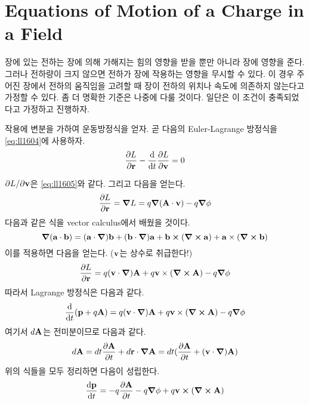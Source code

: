 \section{Equations of Motion of a Charge in a Field}
\label{sec:05a-03a}

장에 있는 전하는 장에 의해 가해지는 힘의 영향을 받을 뿐만 아니라 장에 영향을 준다. 그러나 전하량이 크지 않으면 전하가 장에 작용하는 영향을 무시할 수 있다. 이 경우 주어진 장에서 전하의 움직임을 고려할 때 장이 전하의 위치나 속도에 의존하지 않는다고 가정할 수 있다. 좀 더 명확한 기준은 나중에 다룰 것이다. 일단은 이 조건이 충족되었다고 가정하고 진행하자.

작용에 변분을 가하여 운동방정식을 얻자. 곧 다음의 Euler-Lagrange 방정식을 \eqref{eq:ll1604}에 사용하자.
\begin{equation}
    \pdv{L}{\vb{r}} - \dv{t} \pdv{L}{\vb{v}} = 0
\end{equation}

$\partial L / \partial \vb{v}$은 \eqref{eq:ll1605}와 같다. 그리고 다음을 얻는다.
\begin{equation*}
    \pdv{L}{\vb{r}} = \grad L = q \grad(\vb{A} \cdot \vb{v}) - q \grad \phi
\end{equation*}
다음과 같은 식을 vector calculus에서 배웠을 것이다.
\begin{equation*}
    \grad(\vb{a} \cdot \vb{b}) = (\vb{a} \cdot \grad) \vb{b} + (\vb{b} \cdot \grad) \vb{a} + \vb{b} \cross (\curl \vb{a}) + \vb{a} \times (\curl \vb{b})
\end{equation*}
이를 적용하면 다음을 얻는다. ($\vb{v}$는 상수로 취급한다!)
\begin{equation*}
    \pdv{L}{\vb{r}} = q (\vb{v} \cdot \grad) \vb{A} + q \vb{v} \times (\curl \vb{A}) - q \grad \phi
\end{equation*}
따라서 Lagrange 방정식은 다음과 같다.
\begin{equation*}
    \dv{t}(\vb{p} + q \vb{A}) = q (\vb{v} \cdot \grad) \vb{A} + q \vb{v} \times (\curl \vb{A}) - q \grad \phi
\end{equation*}
여기서 $d \vb{A}$는 전미분이므로 다음과 같다.
\begin{equation*}
    d \vb{A} = dt \pdv{\vb{A}}{t} + d\vb{r} \cdot \grad \vb{A} = dt (\pdv{\vb{A}}{t} + (\vb{v} \cdot \grad) \vb{A})
\end{equation*}
위의 식들을 모두 정리하면 다음이 성립한다.
\begin{equation}
    \dv{\vb{p}}{t} = - q \pdv{\vb{A}}{t} - q \grad \phi + q \vb{v} \cross (\curl \vb{A})
\end{equation}


